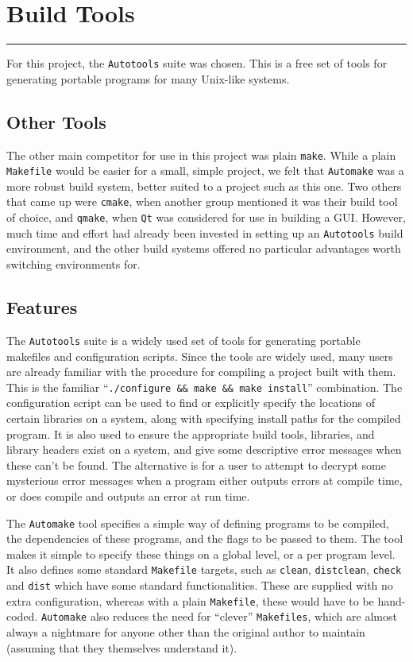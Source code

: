 \section{Build Tools}
\vspace{-2em}\rule{\textwidth}{1pt}\vspace{1em}

For this project, the \texttt{Autotools} suite was chosen.
This is a free set of tools for generating portable programs for many
Unix-like systems.

\subsection{Other Tools}
The other main competitor for use in this project was plain \texttt{make}.
While a plain \texttt{Makefile} would be easier for a small, simple project,
we felt that \texttt{Automake} was a more robust build system, better suited
to a project such as this one.
Two others that came up were \texttt{cmake}, when another group mentioned it
was their build tool of choice, and \texttt{qmake}, when \texttt{Qt} was
considered for use in building a GUI.
However, much time and effort had already been invested in setting up
an \texttt{Autotools} build environment, and the other build systems offered
no particular advantages worth switching environments for.

\subsection{Features}
The \texttt{Autotools} suite is a widely used set of tools for generating
portable makefiles and configuration scripts.
Since the tools are widely used, many users are already familiar with
the procedure for compiling a project built with them.
This is the familiar ``\texttt{./configure \&\& make \&\& make install}''
combination.
The configuration script can be used to find or explicitly specify the
locations of certain libraries on a system, along with specifying install
paths for the compiled program.
It is also used to ensure the appropriate build tools, libraries, and
library headers exist on a system, and give some descriptive error
messages when these can't be found.
The alternative is for a user to attempt to decrypt some mysterious
error messages when a program either outputs errors at compile time, or does
compile and outputs an error at run time.

The \texttt{Automake} tool specifies a simple way of defining programs to be
compiled, the dependencies of these programs, and the flags to be passed
to them.
The tool makes it simple to specify these things on a global level, or a
per program level.
It also defines some standard \texttt{Makefile} targets, such as
\texttt{clean}, \texttt{distclean}, \texttt{check} and \texttt{dist}
which have some standard functionalities.
These are supplied with no extra configuration, whereas with a plain
\texttt{Makefile}, these would have to be hand-coded.
\texttt{Automake} also reduces the need for ``clever'' \texttt{Makefiles},
which are almost always a nightmare for anyone other than the original
author to maintain (assuming that they themselves understand it).

